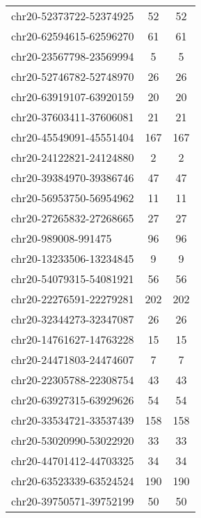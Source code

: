 \begin{longtable}{lSS}
	chr20-52373722-52374925 & 52     & 52                         \\
	chr20-62594615-62596270 & 61     & 61                         \\
	chr20-23567798-23569994 & 5      & 5                          \\
	chr20-52746782-52748970 & 26     & 26                         \\
	chr20-63919107-63920159 & 20     & 20                         \\
	chr20-37603411-37606081 & 21     & 21                         \\
	chr20-45549091-45551404 & 167    & 167                        \\
	chr20-24122821-24124880 & 2      & 2                          \\
	chr20-39384970-39386746 & 47     & 47                         \\
	chr20-56953750-56954962 & 11     & 11                         \\
	chr20-27265832-27268665 & 27     & 27                         \\
	chr20-989008-991475     & 96     & 96                         \\
	chr20-13233506-13234845 & 9      & 9                          \\
	chr20-54079315-54081921 & 56     & 56                         \\
	chr20-22276591-22279281 & 202    & 202                        \\
	chr20-32344273-32347087 & 26     & 26                         \\
	chr20-14761627-14763228 & 15     & 15                         \\
	chr20-24471803-24474607 & 7      & 7                          \\
	chr20-22305788-22308754 & 43     & 43                         \\
	chr20-63927315-63929626 & 54     & 54                         \\
	chr20-33534721-33537439 & 158    & 158                        \\
	chr20-53020990-53022920 & 33     & 33                         \\
	chr20-44701412-44703325 & 34     & 34                         \\
	chr20-63523339-63524524 & 190    & 190                        \\
	chr20-39750571-39752199 & 50     & 50                         \\

\end{longtable}
